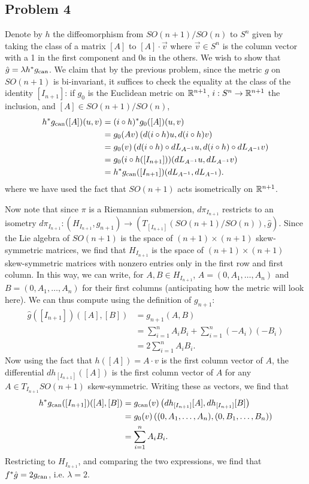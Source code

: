 \documentclass{../mathnotes}
\begin{document}
\subsection*{Problem 4}
Denote by $h$ the diffeomorphism from $SO(n+1)/SO(n)$ to $S^n$ given by taking the class of a matrix $[A]$
to $[A]\cdot \vec v$ where $\vec v\in S^n$ is the column vector with a 1 in the first component and 0s in the others.
We wish to show that $\hat g=\lambda h^*g_{\rm can}$. We claim that by the previous problem, since the 
metric $g$ on $SO(n+1)$ is bi-invariant, it suffices to check the equality at the class of the identity $[I_{n+1}]$:
if $g_0$ is the Euclidean metric on $\mathbb{R}^{n+1}$, $i:S^n\to\mathbb{R}^{n+1}$ the inclusion, and $[A]\in SO(n+1)/SO(n)$,
\begin{align*}
    h^*g_{\rm can}([A])(u,v) &= (i\circ h)^*g_0([A])(u,v)\\
    &= g_0(Av)\left( d(i\circ h)u,d(i\circ h)v \right)\\
    &= g_0(v)\left( d(i\circ h)\circ dL_{A^{-1}}u,d(i\circ h)\circ dL_{A^{-1}}v \right)\\
    &= g_0(i\circ h([I_{n+1}]))(dL_{A^{-1}}u, dL_{A^{-1}}v)\\
    &= h^*g_{\rm can}([I_{n+1}])(dL_{A^{-1}},dL_{A^{-1}}).
\end{align*}
where we have used the fact that $SO(n+1)$ acts isometrically on $\mathbb{R}^{n+1}$.

Now note that since $\pi$ is a Riemannian submersion, $d\pi_{I_{n+1}}$ restricts to an isometry $d\pi_{I_{n+1}}:(H_{I_{n+1}},g_{n+1})\to(T_{[I_{n+1}]}(SO(n+1)/SO(n)),\hat g)$.
Since the Lie algebra of $SO(n+1)$ is the space of $(n+1)\times(n+1)$ skew-symmetric matrices,  we find that $H_{I_{n+1}}$ is the space of $(n+1)\times(n+1)$
skew-symmetric matrices with nonzero entries only in the first row and first column. In this way, we can write, for $A,B\in H_{I_{n+1}}$,
$A=(0,A_1,\ldots,A_n)$ and $B=(0,A_1,\ldots,A_n)$ for their first columns (anticipating how the metric will look here).
We can thus compute using the definition of $g_{n+1}$:
\begin{align*}
    \hat g([I_{n+1}])([A],[B]) &= g_{n+1}(A,B) \\
    &= \sum_{i=1}^nA_iB_i+\sum_{i=1}^n(-A_i)(-B_i)\\
    &= 2\sum_{i=1}^nA_iB_i.
\end{align*}
Now using the fact that $h([A])=A\cdot v$ is the first column vector of $A$, the differential $dh_{[I_{n+1}]}([A])$ is the 
first column vector of $A$ for any $A\in T_{I_{n+1}}SO(n+1)$ skew-symmetric. Writing these as vectors, we find that
\begin{align*}
    h^*g_{\rm can}([I_{n+1}])([A],[B]) &= g_{\rm can}(v)\left( dh_{[I_{n+1}]}[A],dh_{[I_{n+1}]}[B] \right)\\
    &= g_0(v)\left( (0,A_1,\ldots,A_n),(0,B_1,\ldots,B_n) \right)\\
    &= \sum_{i=1}^nA_iB_i.
\end{align*}
Restricting to $H_{I_{n+1}}$, and comparing the two expressions, we find that $f^*\hat g=2g_{\rm can}$, i.e. $\lambda=2$.
\end{document}
